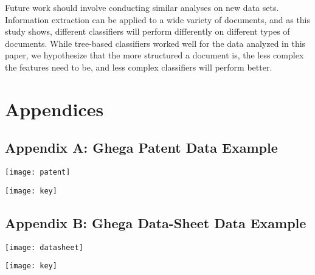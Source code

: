 \documentclass[twoside,11pt]{article}
\renewcommand{\>}{{\rightarrow}}
\newcommand{\1}{{\mathbf 1}}
\newcommand{\0}{{\mathbf 0}}
\begin{document}
Future work should involve conducting similar analyses on new data sets. Information extraction can be applied to a wide variety of documents, and as this study shows, different classifiers will perform differently on different types of documents. While tree-based classifiers worked well for the data analyzed in this paper, we hypothesize that the more structured a document is, the less complex the features need to be, and less complex classifiers will perform better.

\newpage




\newpage

\section{Appendices}
\subsection{Appendix A: Ghega Patent Data Example}
\texttt{[image: patent]}

\texttt{[image: key]}

\newpage
\subsection{Appendix B: Ghega Data-Sheet Data Example}
\texttt{[image: datasheet]}

\texttt{[image: key]}
\end{document}

